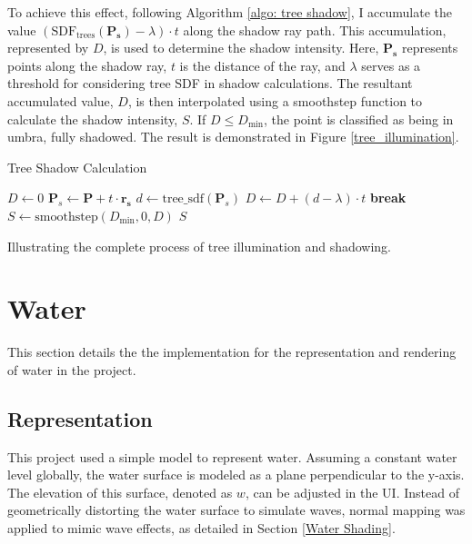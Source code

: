 To achieve this effect, following Algorithm \ref{algo: tree shadow}, I accumulate the value $(\text{SDF}_{\text{trees}}(\mathbf{P_s}) - \lambda) \cdot t$ along the shadow ray path. This accumulation, represented by $D$, is used to determine the shadow intensity. Here, $\mathbf{P_s}$ represents points along the shadow ray, $t$ is the distance of the ray, and $\lambda$ serves as a threshold for considering tree SDF in shadow calculations. The resultant accumulated value, $D$, is then interpolated using a smoothstep function to calculate the shadow intensity, $S$. If $D \le D_{\text{min}}$, the point is classified as being in umbra, fully shadowed. The result is demonstrated in Figure \ref{tree_illumination}.

\begin{algorithm}
\caption{Tree Shadow Calculation}
\label{algo: tree shadow}
\begin{algorithmic}
    \State $D \gets 0$
        \State $\mathbf{P}_s \gets \mathbf{P} + t \cdot \mathbf{r_s}$
        \State $d \gets \text{tree\_sdf}(\mathbf{P}_s)$
            \State $D \gets D + (d - \lambda) \cdot t$
        \EndIf
            \State \textbf{break}
        \EndIf
    \EndFor
    \State $S \gets \text{smoothstep}(D_{\text{min}}, 0, D)$
    \State \Return $S$
\EndFunction
\end{algorithmic}
\end{algorithm}

{Illustrating the complete process of tree illumination and shadowing.}

\section{Water}

This section details the the implementation for the representation and rendering of water in the project.


\subsection{Representation}

This project used a simple model to represent water. Assuming a constant water level globally, the water surface is modeled as a plane perpendicular to the y-axis. The elevation of this surface, denoted as $w$, can be adjusted in the UI. Instead of geometrically distorting the water surface to simulate waves, normal mapping \cite{blinn_simulation_1978} was applied to mimic wave effects, as detailed in Section \ref{Water Shading}.

